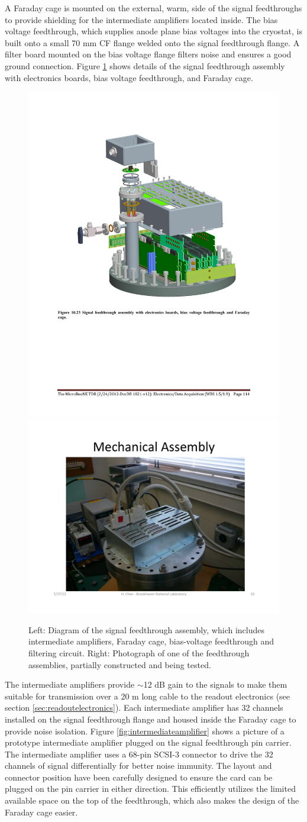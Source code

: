 A Faraday cage is mounted on the external, warm, side of the signal feedthroughs to provide shielding for the intermediate amplifiers located inside.  The bias voltage feedthrough, which supplies anode plane bias voltages into the cryostat, is built onto a small 70 mm CF flange welded onto the signal feedthrough flange. A filter board mounted on the bias voltage flange filters noise and ensures a good ground connection. Figure \ref{fig:feedthroughassembly} shows details of the signal feedthrough assembly with electronics boards, bias voltage feedthrough, and Faraday cage.

\begin{figure}
\begin{center}
\includegraphics[width=0.4\linewidth]{figures/signal_feedthrough_assembly.pdf}
\includegraphics[width=0.4\linewidth]{figures/signal_feedthrough_assembly_photo.pdf}
\end{center}
\caption{\label{fig:feedthroughassembly}Left:  Diagram of the signal feedthrough assembly, which includes intermediate amplifiers, Faraday cage, bias-voltage feedthrough and filtering circuit.  Right: Photograph of one of the feedthrough assemblies, partially constructed and being tested.}
\end{figure}

The intermediate amplifiers provide $\sim$12 dB gain to the \lartpc signals to make them suitable for transmission over a 20 m long cable to the readout electronics (see section \ref{sec:readoutelectronics}).  Each intermediate amplifier has 32 channels installed on the signal feedthrough flange and housed inside the Faraday cage to provide noise isolation. Figure \ref{fig:intermediateamplifier} shows a picture of a prototype intermediate amplifier plugged on the signal feedthrough pin carrier. The intermediate amplifier uses a 68-pin SCSI-3 connector to drive the 32 channels of signal differentially for better noise immunity. The layout and connector position have been carefully designed to ensure the card can be plugged on the pin carrier in either direction. This efficiently utilizes the limited available space on the top of the feedthrough, which also makes the design of the Faraday cage easier.

